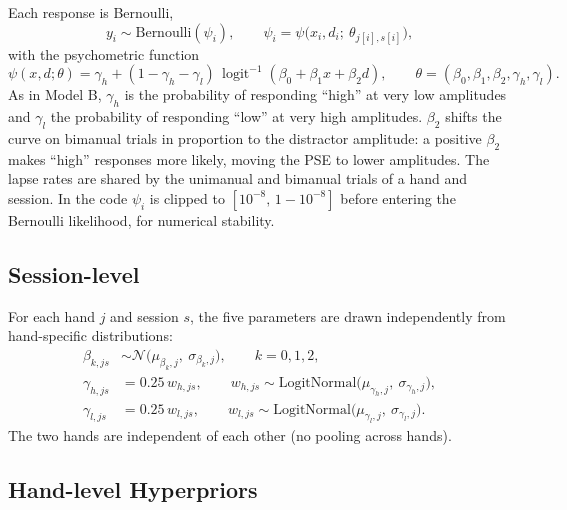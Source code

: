 \documentclass[11pt]{article}
\newcommand{\invlogit}{\operatorname{logit}^{-1}}
\begin{document}
Each response is Bernoulli,
\[
  y_i \sim \text{Bernoulli}(\psi_i), \qquad
  \psi_i = \psi\big(x_i, d_i;\ \theta_{j[i],s[i]}\big),
\]
with the psychometric function
\[
  \psi(x, d;\theta) = \gamma_h + (1 - \gamma_h - \gamma_l)\,\invlogit(\beta_0 + \beta_1 x + \beta_2 d),
  \qquad \theta = (\beta_0, \beta_1, \beta_2, \gamma_h, \gamma_l).
\]
As in Model B, $\gamma_h$ is the probability of responding ``high'' at very low
amplitudes and $\gamma_l$ the probability of responding ``low'' at very high
amplitudes. $\beta_2$ shifts the curve on bimanual trials in proportion to the
distractor amplitude: a positive $\beta_2$ makes ``high'' responses more likely,
moving the PSE to lower amplitudes. The lapse rates are shared by the unimanual and
bimanual trials of a hand and session. In the code $\psi_i$ is clipped to
$[10^{-8},\,1-10^{-8}]$ before entering the Bernoulli likelihood, for numerical
stability.

\subsection{Session-level}

For each hand $j$ and session $s$, the five parameters are drawn independently
from hand-specific distributions:
\begin{align*}
  \beta_{k,js} &\sim \mathcal{N}\big(\mu_{\beta_k,j},\ \sigma_{\beta_k,j}\big), \qquad k = 0, 1, 2, \\
  \gamma_{h,js} &= 0.25\, w_{h,js}, \qquad
      w_{h,js} \sim \text{LogitNormal}\big(\mu_{\gamma_h,j},\ \sigma_{\gamma_h,j}\big), \\
  \gamma_{l,js} &= 0.25\, w_{l,js}, \qquad
      w_{l,js} \sim \text{LogitNormal}\big(\mu_{\gamma_l,j},\ \sigma_{\gamma_l,j}\big).
\end{align*}
The two hands are independent of each other (no pooling across hands).

\subsection{Hand-level Hyperpriors}
\end{document}
